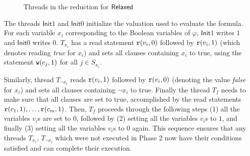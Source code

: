 \begin{figure}[t]
\caption{Threads in the reduction for $\mathsf{Relaxed}$}
    \label{tab:reduction-threads-relaxed}
\end{figure}

The threads $\mathsf{Init}{1}$ and $\mathsf{Init}{0}$ initialize the valuation used to evaluate the formula. For each variable $x_i$ corresponding to the Boolean variables of $\varphi$, $\mathsf{Init}{1}$ writes $1$ and $\mathsf{Init}{0}$ writes $0$. 
$T_{x_i}$ has a read statement $\mathtt{r}(v_i,0)$ followed by $\mathtt{r}(v_i,1)$ (which denotes reading \emph{true} for $x_i$) and sets all clauses containing $x_i$ to true, using the statement $\mathtt{w}(c_j, 1)$ for all $j \in S_{x_i}$. 


Similarly, thread $T_{\neg x_i}$ reads $\mathtt{r}(v_i, 1)$ followed by $\mathtt{r}(v_i, 0)$ (denoting the value \emph{false} for $x_i$) and sets all clauses containing $\neg x_i$ to true. 
Finally the thread $T_{f}$ needs to make sure that all clauses are set to true, accomplished by the read statements $\mathtt{r}(c_1, 1), \dots, \mathtt{r}(c_m, 1)$.
Then, $T_{f}$ proceeds through the following steps (1) all the variables $v_i$s are set to $0$, followed by (2) setting all the variables $v_i$s to $1$, and finally (3) setting all the variables $v_i$s to $0$ again.
This sequence ensures that any threads $T_{x_i}$, $T_{\neg x_i}$ which were not executed in Phase 2 now have their conditions satisfied and can complete their execution. 

